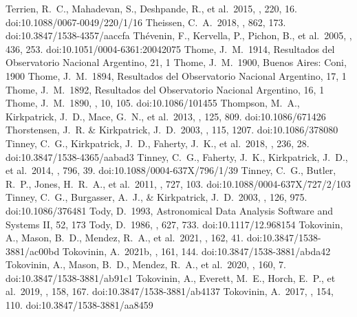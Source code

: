\documentclass[twocolumn,tighten,twocolappendix]{aastex631}
\begin{document}
\begin{thebibliography}{}
 Terrien, R.~C., Mahadevan, S., Deshpande, R., et al.\ 2015, \apjs, 220, 16. doi:10.1088/0067-0049/220/1/16
 Theissen, C.~A.\ 2018, \apj, 862, 173. doi:10.3847/1538-4357/aaccfa
 Th{\'e}venin, F., Kervella, P., Pichon, B., et al.\ 2005, \aap, 436, 253. doi:10.1051/0004-6361:20042075
 Thome, J.~M.\ 1914, Resultados del Observatorio Nacional Argentino, 21, 1
 Thome, J.~M.\ 1900, Buenos Aires: Coni, 1900
 Thome, J.~M.\ 1894, Resultados del Observatorio Nacional Argentino, 17, 1
 Thome, J.~M.\ 1892, Resultados del Observatorio Nacional Argentino, 16, 1
 Thome, J.~M.\ 1890, \aj, 10, 105. doi:10.1086/101455
 Thompson, M.~A., Kirkpatrick, J.~D., Mace, G.~N., et al.\ 2013, \pasp, 125, 809. doi:10.1086/671426
 Thorstensen, J.~R. \& Kirkpatrick, J.~D.\ 2003, \pasp, 115, 1207. doi:10.1086/378080
 Tinney, C.~G., Kirkpatrick, J.~D., Faherty, J.~K., et al.\ 2018, \apjs, 236, 28. doi:10.3847/1538-4365/aabad3
 Tinney, C.~G., Faherty, J.~K., Kirkpatrick, J.~D., et al.\ 2014, \apj, 796, 39. doi:10.1088/0004-637X/796/1/39
 Tinney, C.~G., Butler, R.~P., Jones, H.~R.~A., et al.\ 2011, \apj, 727, 103. doi:10.1088/0004-637X/727/2/103
 Tinney, C.~G., Burgasser, A.~J., \& Kirkpatrick, J.~D.\ 2003, \aj, 126, 975. doi:10.1086/376481
 Tody, D.\ 1993, Astronomical Data Analysis Software and Systems II, 52, 173
 Tody, D.\ 1986, \procspie, 627, 733. doi:10.1117/12.968154
 Tokovinin, A., Mason, B.~D., Mendez, R.~A., et al.\ 2021, \aj, 162, 41. doi:10.3847/1538-3881/ac00bd
 Tokovinin, A.\ 2021b, \aj, 161, 144. doi:10.3847/1538-3881/abda42
 Tokovinin, A., Mason, B.~D., Mendez, R.~A., et al.\ 2020, \aj, 160, 7. doi:10.3847/1538-3881/ab91c1
 Tokovinin, A., Everett, M.~E., Horch, E.~P., et al.\ 2019, \aj, 158, 167. doi:10.3847/1538-3881/ab4137
 Tokovinin, A.\ 2017, \aj, 154, 110. doi:10.3847/1538-3881/aa8459

\end{thebibliography}
\end{document}
